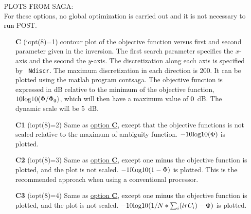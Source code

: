 \documentclass{saclantc}
\begin{document}
\noindent PLOTS FROM  {\sf SAGA}: \\
For these options, no global optimization is carried out and it is not necessary to run {\sc POST}. 

\vspace{-0.6cm}
\begin{itemize}
    \item[{\bf C}] (iopt(8)=1) contour plot of the objective function
versus first and second parameter given in the inversion. The first
search parameter specifies the $x$-axis and the second the
$y$-axis. The discretization along each axis is specified by {\tt
Ndiscr}. The maximum discretization in each direction is 200.
It can be  plotted using the matlab program {\sf contsaga}.
The objective function is expressed in dB relative to the minimum of
the objective function, $10 { \rm log10} (\Phi/\Phi_0)$, which will
then have a maximum value of 0~dB. The dynamic scale will be 5~dB. 
 \vspace{-0.3cm}    \item[{\bf C1}] (iopt(8)=2) 
Same as \underline{option {\bf C}}, except that the objective functions
 is not scaled relative to the maximum of ambiguity function.  $-10 { \rm log10} (\Phi)$ is plotted.
 \vspace{-0.3cm}    \item[{\bf C2}] (iopt(8)=3) 
Same as \underline{option {\bf C}}, except one minus the objective function
 is plotted, and the plot is not scaled. $-10 { \rm log10} (1-\Phi)$ is plotted.
This is the recommended approach when using a conventional processor.
 \vspace{-0.3cm}    \item[{\bf C3}] (iopt(8)=4) 
Same as \underline{option {\bf C}}, except one minus the objective function
 is plotted, and the plot is not scaled. $-10 { \rm log10} (1/N*\sum_{i} (trC_i)-\Phi)$ is plotted.


\end{itemize}
\end{document}
